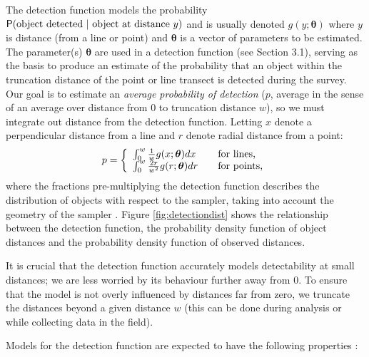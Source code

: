 \documentclass[article]{jss}\usepackage[]{graphicx}\usepackage[]{color}
\begin{document}
The detection function models the probability $\mathsf{P}(\text{object detected } \vert \text{ object at distance } y)$ and is usually denoted $g(y; \boldsymbol{\theta})$ where $y$ is distance (from a line or point) and $\boldsymbol{\theta}$ is a vector of parameters to be estimated. The parameter(s) $\boldsymbol{\theta}$ are used in a detection function (see Section 3.1), serving as the basis to produce an estimate of the probability that an object within the truncation distance of the point or line transect is detected during the survey. Our goal is to estimate an \textit{average probability of detection} ($p$, average in the sense of an average over distance from $0$ to truncation distance $w$), so we must integrate out distance from the detection function. Letting $x$ denote a perpendicular distance from a line and $r$ denote radial distance from a point:
$$
p = \left\{
\begin{array}{l l}
\int_0^w \frac{1}{w}    g(x; \boldsymbol{\theta}) dx & \quad \text{for lines,} \\
\int_0^w \frac{2r}{w^2} g(r; \boldsymbol{\theta}) dr & \quad \text{for points,}
\end{array} \right.
$$
where the fractions pre-multiplying the detection function describes the distribution of objects with respect to the sampler, taking into account the geometry of the sampler \citep[usually referred to as the \textit{probability density function of (object) distances} and denoted $\pi(y)$;][Chapter 3]{Buckland:2001vm}. Figure \ref{fig:detectiondist} shows the relationship between the detection function, the probability density function of object distances and the probability density function of observed distances.

It is crucial that the detection function accurately models detectability at small distances; we are less worried by its behaviour further away from 0. To ensure that the model is not overly influenced by distances far from zero, we truncate the distances beyond a given distance $w$ (this can be done during analysis or while collecting data in the field).

Models for the detection function are expected to have the following properties \citep[][Chapter 5]{buckland2015distance}:
\end{document}
